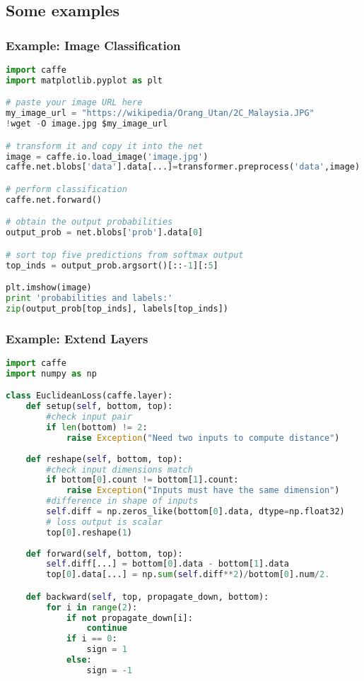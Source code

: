 \subsection{Some examples}
\begin{frame}[fragile]
  \MyLogo
  \frametitle{Example: Image Classification}  

\begin{lstlisting}[language=python]
import caffe
import matplotlib.pyplot as plt

# paste your image URL here
my_image_url = "https://wikipedia/Orang_Utan/2C_Malaysia.JPG"
!wget -O image.jpg $my_image_url

# transform it and copy it into the net
image = caffe.io.load_image('image.jpg')
caffe.net.blobs['data'].data[...]=transformer.preprocess('data',image)

# perform classification
caffe.net.forward()

# obtain the output probabilities
output_prob = net.blobs['prob'].data[0]

# sort top five predictions from softmax output
top_inds = output_prob.argsort()[::-1][:5]

plt.imshow(image)
print 'probabilities and labels:'
zip(output_prob[top_inds], labels[top_inds])
\end{lstlisting}

\vskip 50pt

\end{frame}


\begin{frame}[fragile]
  \MyLogo
  \frametitle{Example: Extend Layers}  
\begin{lstlisting}[language=python]
import caffe
import numpy as np 

class EuclideanLoss(caffe.layer):
	def setup(self, bottom, top):
		#check input pair
		if len(bottom) != 2:
			raise Exception("Need two inputs to compute distance")
			
	def reshape(self, bottom, top):
		#check input dimensions match
		if bottom[0].count != bottom[1].count:
			raise Exception("Inputs must have the same dimension")
		#difference in shape of inputs
		self.diff = np.zeros_like(bottom[0].data, dtype=np.float32)
		# loss output is scalar
		top[0].reshape(1)
		
	def forward(self, bottom, top):
		self.diff[...] = bottom[0].data - bottom[1].data
		top[0].data[...] = np.sum(self.diff**2)/bottom[0].num/2.	

	def backward(self, top, propagate_down, bottom):
		for i in range(2):
			if not propagate_down[i]:
				continue
			if i == 0:
				sign = 1
			else:
				sign = -1
\end{lstlisting}
\end{frame}

